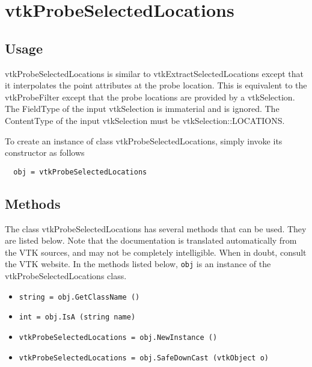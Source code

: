 \section{vtkProbeSelectedLocations}

\subsection{Usage}

 vtkProbeSelectedLocations is similar to vtkExtractSelectedLocations except
 that it interpolates the point attributes at the probe location. This is
 equivalent to the vtkProbeFilter except that the probe locations are provided
 by a vtkSelection. The FieldType of the input vtkSelection is immaterial and
 is ignored. The ContentType of the input vtkSelection must be
 vtkSelection::LOCATIONS.

To create an instance of class vtkProbeSelectedLocations, simply
invoke its constructor as follows
\begin{verbatim}
  obj = vtkProbeSelectedLocations
\end{verbatim}
\subsection{Methods}

The class vtkProbeSelectedLocations has several methods that can be used.
  They are listed below.
Note that the documentation is translated automatically from the VTK sources,
and may not be completely intelligible.  When in doubt, consult the VTK website.
In the methods listed below, \verb|obj| is an instance of the vtkProbeSelectedLocations class.
\begin{itemize}
\item  \verb|string = obj.GetClassName ()|

\item  \verb|int = obj.IsA (string name)|

\item  \verb|vtkProbeSelectedLocations = obj.NewInstance ()|

\item  \verb|vtkProbeSelectedLocations = obj.SafeDownCast (vtkObject o)|

\end{itemize}
